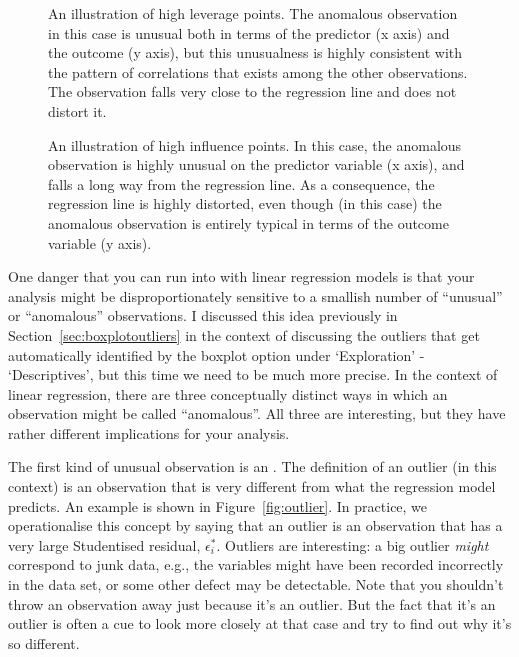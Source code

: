 \begin{figure}[!htb]
\begin{center}
\caption{An illustration of high leverage points. The anomalous observation in this case is unusual both in terms of the predictor (x axis) and the outcome (y axis), but this unusualness is highly consistent with the pattern of correlations that exists among the other observations. The observation falls very close to the regression line and does not distort it.}
\HR
\label{fig:leverage}
\end{center}
\end{figure}

\begin{figure}[!htb]
\begin{center}
\caption{An illustration of high influence points. In this case, the anomalous observation is highly unusual on the predictor variable (x axis), and falls a long way from the regression line. As a consequence, the regression line is highly distorted, even though (in this case) the anomalous observation is entirely typical in terms of the outcome variable (y axis).}
\HR
\label{fig:influence}
\end{center}
\end{figure}

One danger that you can run into with linear regression models is that your analysis might be disproportionately sensitive to a smallish number of ``unusual'' or ``anomalous'' observations. I discussed this idea previously in Section~\ref{sec:boxplotoutliers} in the context of discussing the outliers that get automatically identified by the boxplot option under `Exploration' - `Descriptives', but this time we need to be much more precise. In the context of linear regression, there are three conceptually distinct ways in which an observation might be called ``anomalous''. All three are interesting, but they have rather different implications for your analysis.

The first kind of unusual observation is an . The definition of an outlier (in this context) is an observation that is very different from what the regression model predicts. An example is shown in Figure~\ref{fig:outlier}. In practice, we operationalise this concept by saying that an outlier is an observation that has a very large Studentised residual, $\epsilon_i^*$. Outliers are interesting: a big outlier {\it might} correspond to junk data, e.g., the variables might have been recorded incorrectly in the data set, or some other defect may be detectable. Note that you shouldn't throw an observation away just because it's an outlier. But the fact that it's an outlier is often a cue to look more closely at that case and try to find out why it's so different.

